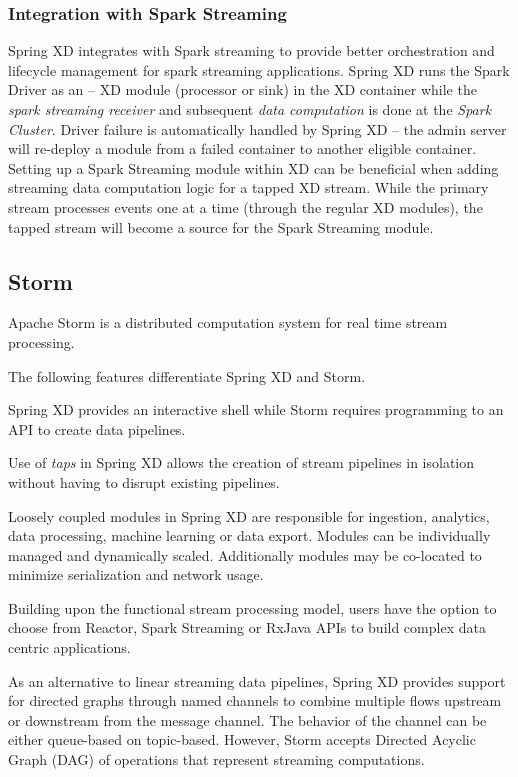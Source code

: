 \subsubsection{Integration with Spark Streaming}
 Spring XD integrates with Spark streaming to provide better orchestration and
lifecycle management for spark streaming applications. Spring XD runs the
Spark Driver as an -- XD module (processor or sink) in the XD container
while the \emph{spark streaming receiver} and subsequent \emph{data computation} is
done at the \emph{Spark Cluster}. Driver failure is automatically handled by
Spring XD -- the admin server will re-deploy a module from a failed container
to another eligible container.
 Setting up a Spark Streaming module within XD can be beneficial when adding
streaming data computation logic for a tapped XD stream. While the primary
stream processes events one at a time (through the regular XD modules),
the tapped stream will become a source for the Spark Streaming module.

\subsection{Storm}
Apache Storm\cite{storm} is a distributed computation system for real time stream
processing.

The following features differentiate Spring XD and Storm.

\begin{itemize*}
\item Spring XD provides an interactive shell while Storm requires programming
to an API to create data pipelines.
\item Use of \emph{taps} in Spring XD allows the creation of stream pipelines
in isolation without having to disrupt existing pipelines.
\item Loosely coupled modules in Spring XD are responsible for ingestion, analytics,
data processing, machine learning or data export. Modules can be individually managed
and dynamically scaled. Additionally modules may be co-located to minimize
serialization and network usage.
\item Building upon the functional stream processing model, users have the option
to choose from Reactor\cite{reactor}, Spark Streaming or RxJava APIs to build
complex data centric applications.
\item As an alternative to linear streaming data pipelines, Spring XD provides
support for directed graphs through named channels to combine multiple flows
upstream or downstream from the message channel. The behavior of the channel
can be either queue-based on topic-based. However, Storm accepts Directed
Acyclic Graph (DAG)\cite{dag} of operations that represent streaming
computations.
\end{itemize*}

